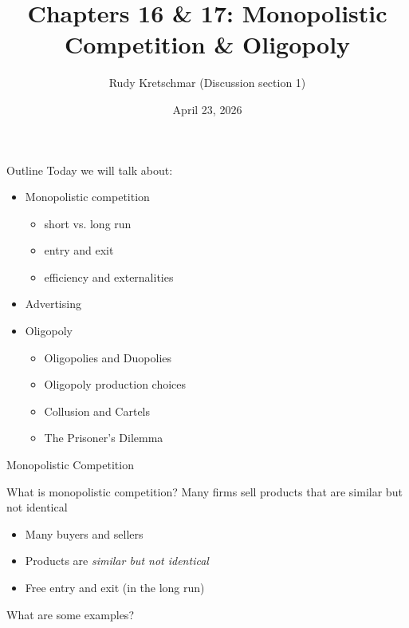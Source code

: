 \documentclass[compress]{beamer}
\title{Chapters 16 \& 17: Monopolistic Competition \& Oligopoly}
\author{Rudy Kretschmar (Discussion section 1)}
\date{April 23, 2026}
\begin{document}
\begin{frame}
    \titlepage 
\end{frame}

\begin{frame}{Outline}
    Today we will talk about:
    \vspace{3mm}
    \begin{itemize}
        \item Monopolistic competition
        \begin{itemize}
            \item short vs. long run
            \item entry and exit
            \item efficiency and externalities
        \end{itemize}
        \item Advertising
        \item Oligopoly
        \begin{itemize}
            \item Oligopolies and Duopolies
            \item Oligopoly production choices
            \item Collusion and Cartels
            \item The Prisoner's Dilemma
        \end{itemize}
    \end{itemize}
\end{frame}

\begin{frame}{Monopolistic Competition}
    \begin{block}{What is monopolistic competition?}
    Many firms sell products that are similar but not identical
        \begin{itemize}
            \item Many buyers and sellers
            \item Products are \textit{similar but not identical}
            \item Free entry and exit (in the long run)
        \end{itemize}
    \end{block}
    \begin{center}
        What are some examples?
    \end{center}
\end{frame}
\end{document}
